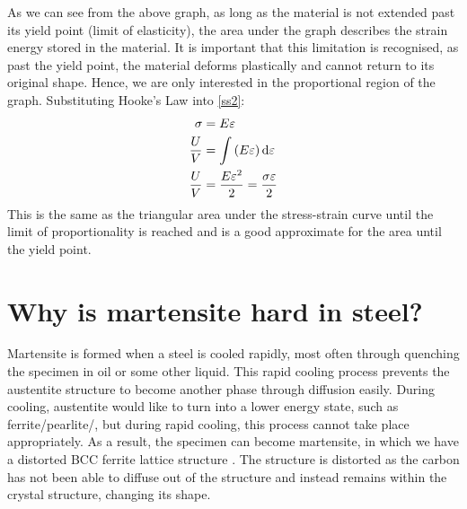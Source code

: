 \documentclass[11pt]{article}
\begin{document}
As we can see from the above graph, as long as the material is not extended past its yield point (limit of elasticity), the area under the graph describes the strain energy stored in the material. It is important that this limitation is recognised, as past the yield point, the material deforms plastically and cannot return to its original shape. Hence, we are only interested in the proportional region of the graph. Substituting Hooke's Law into \ref{ss2}:
\begin{align}
    \sigma &= E\varepsilon\\
    \frac{U}{V} &= \int\left(E\varepsilon\right)\dif \varepsilon\\
    \frac{U}{V} &= \frac{E\varepsilon^2}{2} = \frac{\sigma\varepsilon}{2}
\end{align}
This is the same as the triangular area under the stress-strain curve until the limit of proportionality is reached and is a good approximate for the area until the yield point.
\section{Why is martensite hard in steel?}
Martensite is formed when a steel is cooled rapidly, most often through quenching the specimen in oil or some other liquid. This rapid cooling process prevents the austentite structure to become another phase through diffusion easily. During cooling, austentite would like to turn into a lower energy state, such as ferrite/pearlite/, but during rapid cooling, this process cannot take place appropriately. As a result, the specimen can become martensite, in which we have a distorted BCC ferrite lattice structure \cite{b1}. The structure is distorted as the carbon has not been able to diffuse out of the structure and instead remains within the crystal structure, changing its shape.
\end{document}
